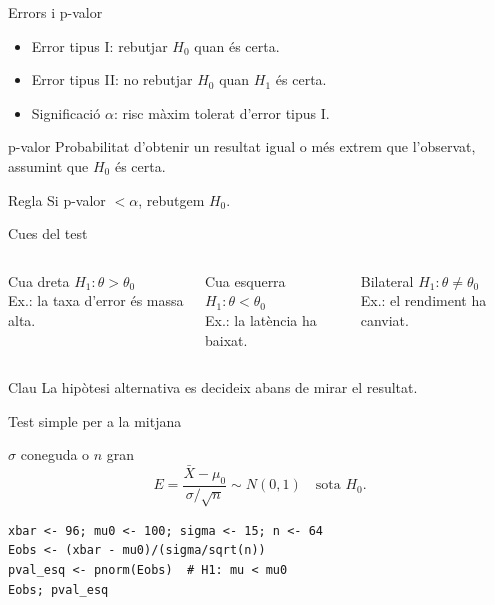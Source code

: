 \documentclass[10pt,aspectratio=169]{beamer}
\begin{document}
\begin{frame}[fragile]{Errors i p-valor}
\begin{itemize}
  \item Error tipus I: rebutjar $H_0$ quan és certa.
  \item Error tipus II: no rebutjar $H_0$ quan $H_1$ és certa.
  \item Significació $\alpha$: risc màxim tolerat d'error tipus I.
\end{itemize}
\begin{block}{p-valor}
Probabilitat d'obtenir un resultat igual o més extrem que l'observat, assumint que $H_0$ és certa.
\end{block}
\begin{alertblock}{Regla}
Si p-valor $<\alpha$, rebutgem $H_0$.
\end{alertblock}
\end{frame}

\begin{frame}[fragile]{Cues del test}
\begin{columns}[T]
\begin{block}{Cua dreta}
$H_1:\theta>\theta_0$\\
Ex.: la taxa d'error és massa alta.
\end{block}
\begin{block}{Cua esquerra}
$H_1:\theta<\theta_0$\\
Ex.: la latència ha baixat.
\end{block}
\begin{block}{Bilateral}
$H_1:\theta\ne\theta_0$\\
Ex.: el rendiment ha canviat.
\end{block}
\end{columns}
\vspace{0.3cm}
\begin{alertblock}{Clau}
La hipòtesi alternativa es decideix abans de mirar el resultat.
\end{alertblock}
\end{frame}

\begin{frame}[fragile]{Test simple per a la mitjana}
\begin{block}{$\sigma$ coneguda o $n$ gran}
\[
E=\frac{\bar X-\mu_0}{\sigma/\sqrt n}\sim N(0,1)\quad \text{sota }H_0.
\]
\end{block}
\begin{lstlisting}
xbar <- 96; mu0 <- 100; sigma <- 15; n <- 64
Eobs <- (xbar - mu0)/(sigma/sqrt(n))
pval_esq <- pnorm(Eobs)  # H1: mu < mu0
Eobs; pval_esq
\end{lstlisting}
\end{frame}
\end{document}
